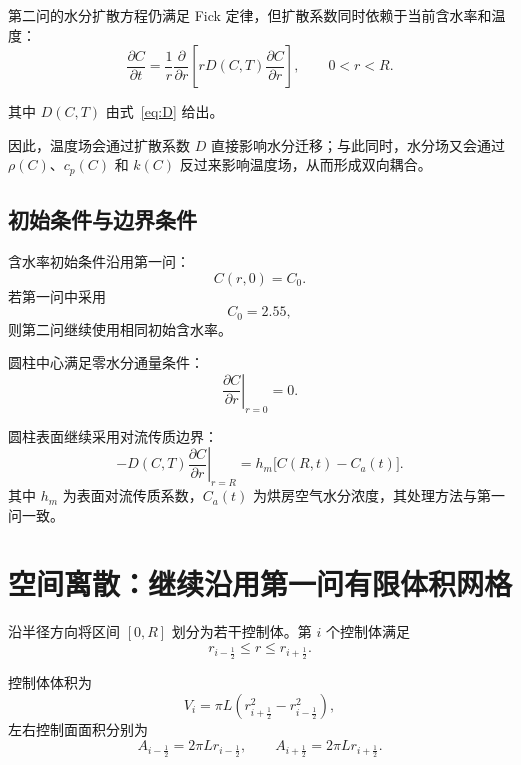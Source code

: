 \documentclass[UTF8,a4paper,12pt]{ctexart}
\begin{document}
第二问的水分扩散方程仍满足 Fick 定律，但扩散系数同时依赖于当前含水率和温度：
\begin{equation}
    \frac{\partial C}{\partial t}
    =
    \frac{1}{r}
    \frac{\partial}{\partial r}
    \left[
        rD(C,T)\frac{\partial C}{\partial r}
    \right],
    \qquad 0<r<R.
    \label{eq:moisture-pde}
\end{equation}

其中 $D(C,T)$ 由式~\eqref{eq:D} 给出。

因此，温度场会通过扩散系数 $D$ 直接影响水分迁移；与此同时，水分场又会通过 $\rho(C)$、$c_p(C)$ 和 $k(C)$ 反过来影响温度场，从而形成双向耦合。

\subsection{初始条件与边界条件}

含水率初始条件沿用第一问：
\begin{equation}
    C(r,0)=C_0.
\end{equation}
若第一问中采用
\[
C_0=2.55,
\]
则第二问继续使用相同初始含水率。

圆柱中心满足零水分通量条件：
\begin{equation}
    \left.
    \frac{\partial C}{\partial r}
    \right|_{r=0}
    =0.
    \label{eq:moisture-center}
\end{equation}

圆柱表面继续采用对流传质边界：
\begin{equation}
    -D(C,T)
    \left.
    \frac{\partial C}{\partial r}
    \right|_{r=R}
    =
    h_m\bigl[C(R,t)-C_a(t)\bigr].
    \label{eq:moisture-surface}
\end{equation}
其中 $h_m$ 为表面对流传质系数，$C_a(t)$ 为烘房空气水分浓度，其处理方法与第一问一致。

\section{空间离散：继续沿用第一问有限体积网格}

沿半径方向将区间 $[0,R]$ 划分为若干控制体。第 $i$ 个控制体满足
\begin{equation}
    r_{i-\frac12}\le r\le r_{i+\frac12}.
\end{equation}

控制体体积为
\begin{equation}
    V_i
    =
    \pi L
    \left(
        r_{i+\frac12}^2-r_{i-\frac12}^2
    \right),
    \label{eq:Vi}
\end{equation}
左右控制面面积分别为
\begin{equation}
    A_{i-\frac12}=2\pi Lr_{i-\frac12},
    \qquad
    A_{i+\frac12}=2\pi Lr_{i+\frac12}.
    \label{eq:Ai}
\end{equation}
\end{document}
